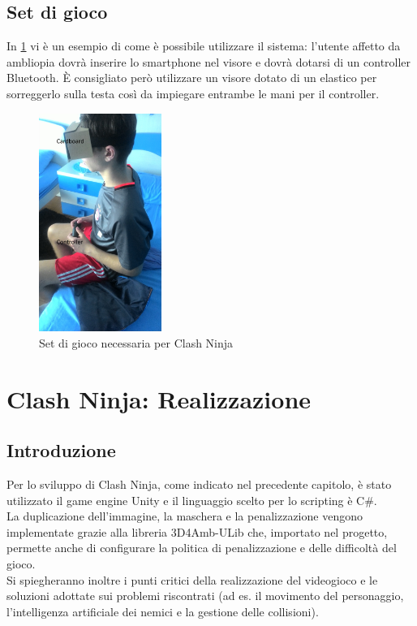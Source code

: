 \documentclass[12pt,a4paper,openright,twoside]{book}
\begin{document}
	\section{Set di gioco}
	In \figurename \ref*{fig:gameset} vi è un esempio di come è possibile utilizzare il sistema: l'utente affetto da ambliopia dovrà inserire lo smartphone nel visore e dovrà dotarsi di un controller Bluetooth. È consigliato però utilizzare un visore dotato di un elastico per sorreggerlo sulla testa così da impiegare entrambe le mani per il controller.
	\begin{figure}[h]
		\centering
		\includegraphics[width=40mm]{gameset.jpg}
		\caption{Set di gioco necessaria per Clash Ninja}
		\label{fig:gameset}
	\end{figure}
\newpage
\thispagestyle{empty}
	\chapter{Clash Ninja: Realizzazione}
	\section{Introduzione}
	Per lo sviluppo di Clash Ninja, come indicato nel precedente capitolo, è stato utilizzato il game engine Unity e il linguaggio scelto per lo scripting è C\#.\\
	La duplicazione dell'immagine, la maschera e la penalizzazione vengono implementate grazie alla libreria 3D4Amb-ULib che, importato nel progetto, permette anche di configurare la politica di penalizzazione e delle difficoltà del gioco.\\
	Si spiegheranno inoltre i punti critici della realizzazione del videogioco e le soluzioni adottate sui problemi riscontrati (ad es. il movimento del personaggio, l'intelligenza artificiale dei nemici e la gestione delle collisioni).\\
	
\end{document}
